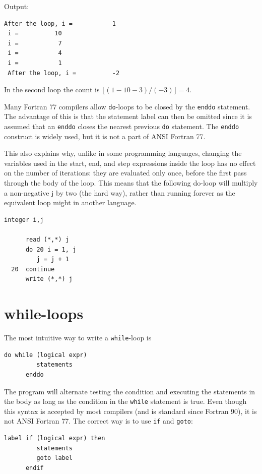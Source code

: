 Output:

\begin{lstlisting}[style=output]
 After the loop, i =           1
 i =          10
 i =           7
 i =           4
 i =           1
 After the loop, i =          -2
\end{lstlisting}

In the second loop the count is $\lfloor (1 - 10 - 3)/(-3) \rfloor = 4$.

Many Fortran 77 compilers allow \texttt{do}-loops to be closed by the \texttt{enddo} statement. The advantage of this is that the statement label can then be omitted since it is assumed that an \texttt{enddo} closes the nearest previous \texttt{do} statement. The \texttt{enddo} construct is widely used, but it is not a part of ANSI Fortran 77.

This also explains why, unlike in some programming languages, changing the variables used in the start, end, and step expressions inside the loop has no effect on the number of iterations: they are evaluated only once, before the first pass through the body of the loop. This means that the following do-loop will multiply a non-negative j by two (the hard way), rather than running forever as the equivalent loop might in another language.

\begin{lstlisting}[style=fortran77]
      integer i,j
 
      read (*,*) j
      do 20 i = 1, j
         j = j + 1
  20  continue
      write (*,*) j
\end{lstlisting}

\section{while-loops}

The most intuitive way to write a \texttt{while}-loop is

\begin{lstlisting}[style=fortran77]
      do while (logical expr)
         statements
      enddo
\end{lstlisting}

The program will alternate testing the condition and executing the statements in the body as long as the condition in the \texttt{while} statement is true. Even though this syntax is accepted by most compilers (and is standard since Fortran 90), it is not ANSI Fortran 77. The correct way is to use \texttt{if} and \texttt{goto}:

\begin{lstlisting}[style=fortran77]
label if (logical expr) then
         statements
         goto label
      endif 
\end{lstlisting}

